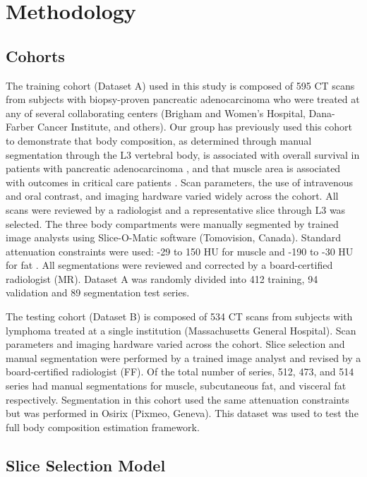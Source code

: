 \documentclass{llncs}
\begin{document}
\section{Methodology}\subsection{Cohorts}

The training cohort (Dataset A) used in this study is composed of 595 CT scans from subjects with biopsy-proven pancreatic adenocarcinoma who were treated at any of several collaborating centers (Brigham and Women's Hospital, Dana-Farber Cancer Institute, and others).
Our group has previously used this cohort to demonstrate that body composition, as determined through manual segmentation through the L3 vertebral body, is associated with overall survival in patients with pancreatic adenocarcinoma \cite{Danai2018}, and that muscle area is associated with outcomes in critical care patients \cite{Foldyna2018}.
Scan parameters, the use of intravenous and oral contrast, and imaging hardware varied widely across the cohort.
All scans were reviewed by a radiologist and a representative slice through L3 was selected.
The three body compartments were manually segmented by trained image analysts using Slice-O-Matic software (Tomovision, Canada).
Standard attenuation constraints were used: -29 to 150 HU for muscle and -190 to -30 HU for fat \cite{Prado2008}.
All segmentations were reviewed and corrected by a board-certified radiologist (MR).
Dataset A was randomly divided into 412 training, 94 validation and 89 segmentation test series.

The testing cohort (Dataset B) is composed of 534 CT scans from subjects with lymphoma treated at a single institution (Massachusetts General Hospital).
Scan parameters and imaging hardware varied across the cohort.
Slice selection and manual segmentation were performed by a trained image analyst and revised by a board-certified radiologist (FF).
Of the total number of series, 512, 473, and 514 series had manual segmentations for muscle, subcutaneous fat, and visceral fat respectively.
Segmentation in this cohort used the same attenuation constraints but was performed in Osirix (Pixmeo, Geneva).
This dataset was used to test the full body composition estimation framework.
\subsection{Slice Selection Model}\label{ssec:slice-selection}
\end{document}
